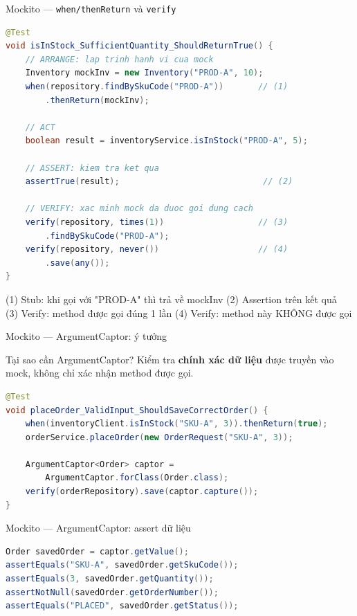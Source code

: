 \documentclass[aspectratio=169,12pt]{beamer}
\begin{document}
\begin{frame}[fragile,shrink=12]{Mockito --- \texttt{when/thenReturn} và \texttt{verify}}
\begin{lstlisting}[language=java]
@Test
void isInStock_SufficientQuantity_ShouldReturnTrue() {
    // ARRANGE: lap trinh hanh vi cua mock
    Inventory mockInv = new Inventory("PROD-A", 10);
    when(repository.findBySkuCode("PROD-A"))       // (1)
        .thenReturn(mockInv);

    // ACT
    boolean result = inventoryService.isInStock("PROD-A", 5);

    // ASSERT: kiem tra ket qua
    assertTrue(result);                             // (2)

    // VERIFY: xac minh mock da duoc goi dung cach
    verify(repository, times(1))                   // (3)
        .findBySkuCode("PROD-A");
    verify(repository, never())                    // (4)
        .save(any());
}
\end{lstlisting}
  \vspace{-0.3em}
  {\small (1) Stub: khi gọi với "PROD-A" thì trả về mockInv \quad
          (2) Assertion trên kết quả\\
          (3) Verify: method được gọi đúng 1 lần \quad
          (4) Verify: method này KHÔNG được gọi}
\end{frame}

\begin{frame}[fragile,shrink=12]{Mockito --- ArgumentCaptor: ý tưởng}
  \begin{block}{Tại sao cần ArgumentCaptor?}
    Kiểm tra \textbf{chính xác dữ liệu} được truyền vào mock,
    không chỉ xác nhận method được gọi.
  \end{block}

\begin{lstlisting}[language=java]
@Test
void placeOrder_ValidInput_ShouldSaveCorrectOrder() {
    when(inventoryClient.isInStock("SKU-A", 3)).thenReturn(true);
    orderService.placeOrder(new OrderRequest("SKU-A", 3));

    ArgumentCaptor<Order> captor =
        ArgumentCaptor.forClass(Order.class);
    verify(orderRepository).save(captor.capture());
}
\end{lstlisting}
\end{frame}

\begin{frame}[fragile,shrink=12]{Mockito --- ArgumentCaptor: assert dữ liệu}
\begin{lstlisting}[language=java]
Order savedOrder = captor.getValue();
assertEquals("SKU-A", savedOrder.getSkuCode());
assertEquals(3, savedOrder.getQuantity());
assertNotNull(savedOrder.getOrderNumber());
assertEquals("PLACED", savedOrder.getStatus());
\end{lstlisting}
\end{frame}
\end{document}
